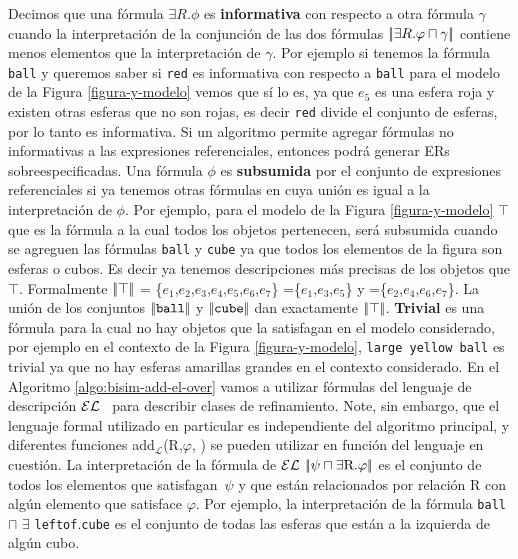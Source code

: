 Decimos que una f\'ormula $\exists R. \phi$ es \textbf{informativa} con respecto a otra f\'ormula $\gamma$ cuando la interpretaci\'on de la conjunci\'on de las dos f\'ormulas $|\!|\exists R. \varphi \sqcap \gamma|\!|$ contiene menos elementos que la interpretaci\'on de $\gamma$. Por ejemplo si tenemos la f\'ormula \texttt{ball} y 
queremos saber si \texttt{red} es informativa con respecto a \texttt{ball} para el modelo de la Figura \ref{figura-y-modelo} vemos que s\'i lo es, ya que $e_5$ es una esfera roja y existen otras esferas que no son rojas,
 es decir \texttt{red} divide el conjunto de esferas, por lo tanto es informativa. Si un algoritmo permite agregar f\'ormulas no informativas a las expresiones referenciales, entonces podr\'a generar ERs sobreespecificadas.
Una f\'ormula $\phi$ es \textbf{subsumida} por el conjunto de expresiones referenciales si ya tenemos otras f\'ormulas en \RE cuya uni\'on es igual a la interpretaci\'on de $\phi$. Por ejemplo, para el modelo de la Figura \ref{figura-y-modelo} $\top$ que es la f\'ormula a la cual todos los objetos pertenecen, ser\'a subsumida cuando se agreguen 
las f\'ormulas \texttt{ball} y \texttt{cube} ya que todos los elementos de la figura son esferas o cubos. Es decir ya tenemos descripciones m\'as precisas de los objetos que $\top$. Formalmente $|\!|\top|\!|$ = \{$e_1$,$e_2$,$e_3$,$e_4$,$e_5$,$e_6$,$e_7$\} =\{$e_1$,$e_3$,$e_5$\} y =\{$e_2$,$e_4$,$e_6$,$e_7$\}. La uni\'on de los conjuntos $|\!|\texttt{ball}|\!|$ y $|\!|\texttt{cube}|\!|$ dan exactamente $|\!|\top|\!|$.
\textbf{Trivial} es una f\'ormula para la cual no hay objetos que la satisfagan en el modelo considerado, por ejemplo en el contexto de la 
Figura \ref{figura-y-modelo}, \texttt{large yellow ball} es trivial ya que no hay esferas amarillas grandes en el contexto considerado.
En el Algoritmo \ref{algo:bisim-add-el-over} vamos a utilizar f\'ormulas del lenguaje de descripci\'on $\mathcal{EL}$~\cite{baader03} para describir clases de refinamiento.
Note, sin embargo, que el lenguaje formal utilizado en particular es independiente del algoritmo principal, y diferentes 
funciones add$_{\mathcal {L}}$(R,$\varphi $, \RE) se pueden utilizar en funci\'on del lenguaje en cuesti\'on.
La interpretaci\'on de la f\'ormula de $\mathcal{EL}$ $\interp{\psi \sqcap \exists $R.$ \varphi}$ es el conjunto de todos los elementos que 
satisfagan~$\psi$ y que est\'an relacionados por relaci\'on R con alg\'un elemento que satisface $\varphi $.
Por ejemplo, la interpretaci\'on de la f\'ormula \texttt{ball} $\sqcap$ $\exists$ \texttt{leftof}.\texttt{cube} es el conjunto de todas las esferas que est\'an a la izquierda de alg\'un cubo.

